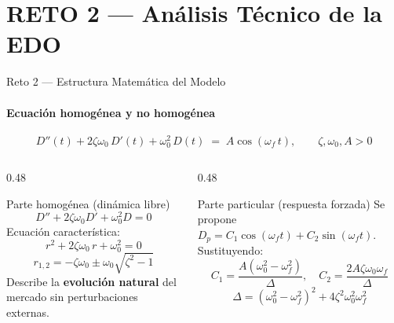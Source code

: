 \documentclass[10pt,aspectratio=169]{beamer}
\begin{document}
\section{RETO 2 — Análisis Técnico de la EDO}

\begin{frame}{Reto 2 — Estructura Matemática del Modelo}
  \framesubtitle{Ecuación homogénea y no homogénea}

  \begin{tcolorbox}[modelbox={EDO completa del modelo}]
    \[
      D''(t) + 2\zeta\omega_0\, D'(t) + \omega_0^2\,D(t)
      \;=\; A\cos(\omega_f\, t),
      \qquad \zeta,\omega_0, A > 0
    \]
  \end{tcolorbox}

  \vspace{6pt}
  \begin{columns}[T]
    \begin{column}{0.48\textwidth}
      \begin{block}{Parte homogénea (dinámica libre)}
        \[
          D''+ 2\zeta\omega_0 D' + \omega_0^2 D = 0
        \]
        Ecuación característica:
        \[
          r^2 + 2\zeta\omega_0\,r + \omega_0^2 = 0
        \]
        \[
          r_{1,2} = -\zeta\omega_0 \pm \omega_0\sqrt{\zeta^2 - 1}
        \]
        Describe la \textbf{evolución natural} del mercado sin
        perturbaciones externas.
      \end{block}
    \end{column}
    \begin{column}{0.48\textwidth}
      \begin{block}{Parte particular (respuesta forzada)}
        Se propone $D_p = C_1\cos(\omega_f t) + C_2\sin(\omega_f t)$.\\[4pt]
        Sustituyendo:
        \[
          C_1 = \frac{A(\omega_0^2 - \omega_f^2)}{\Delta}, \quad
          C_2 = \frac{2A\zeta\omega_0\omega_f}{\Delta}
        \]
        \[
          \Delta = (\omega_0^2 - \omega_f^2)^2 + 4\zeta^2\omega_0^2\omega_f^2
        \]
      \end{block}
    \end{column}
  \end{columns}
\end{frame}
\end{document}
